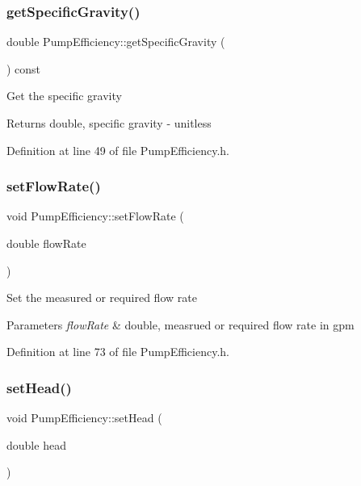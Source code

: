 \subsubsection{\texorpdfstring{get\+Specific\+Gravity()}{getSpecificGravity()}}
{\footnotesize\ttfamily double Pump\+Efficiency\+::get\+Specific\+Gravity (\begin{DoxyParamCaption}{ }\end{DoxyParamCaption}) const\hspace{0.3cm}{\ttfamily [inline]}}

Get the specific gravity \begin{DoxyReturn}{Returns}
double, specific gravity -\/ unitless 
\end{DoxyReturn}


Definition at line 49 of file Pump\+Efficiency.\+h.

\mbox{\label{class_pump_efficiency_aad051c44f6bdbc6108f2c40450c9d510}} 
\subsubsection{\texorpdfstring{set\+Flow\+Rate()}{setFlowRate()}}
{\footnotesize\ttfamily void Pump\+Efficiency\+::set\+Flow\+Rate (\begin{DoxyParamCaption}\item[{double}]{flow\+Rate }\end{DoxyParamCaption})\hspace{0.3cm}{\ttfamily [inline]}}

Set the measured or required flow rate 
\begin{DoxyParams}{Parameters}
{\em flow\+Rate} & double, measrued or required flow rate in gpm \\
\hline
\end{DoxyParams}


Definition at line 73 of file Pump\+Efficiency.\+h.

\mbox{\label{class_pump_efficiency_addfa92d7c30598ecedcee8f7c47eed29}} 
\subsubsection{\texorpdfstring{set\+Head()}{setHead()}}
{\footnotesize\ttfamily void Pump\+Efficiency\+::set\+Head (\begin{DoxyParamCaption}\item[{double}]{head }\end{DoxyParamCaption})\hspace{0.3cm}{\ttfamily [inline]}}

